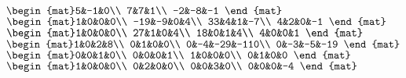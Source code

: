 \begin{Exercise}[
name={},
title={}, 
difficulty=0,
origin={\cite{GH}}]
\begin{multicols}{2}
\Question $\begin{mat}5&-1&0\\  7&7&1\\  -2&-8&-1 \end{mat}$
\Question $\begin{mat}1&0&0&0\\  -19&-9&0&4\\  33&4&1&-7\\  4&2&0&-1 \end{mat}$
\Question $\begin{mat}1&0&0&0\\  27&1&0&4\\  18&0&1&4\\  4&0&0&1 \end{mat}$
\Question $\begin{mat}1&0&2&8\\  0&1&0&0\\  0&-4&-29&-110\\  0&-3&-5&-19 \end{mat}$
\Question $\begin{mat}0&0&1&0\\  0&0&0&1\\  1&0&0&0\\  0&1&0&0 \end{mat}$
\Question $\begin{mat}1&0&0&0\\  0&2&0&0\\  0&0&3&0\\  0&0&0&-4 \end{mat}$
\EndCurrentQuestion
\end{multicols}

\end{Exercise}
